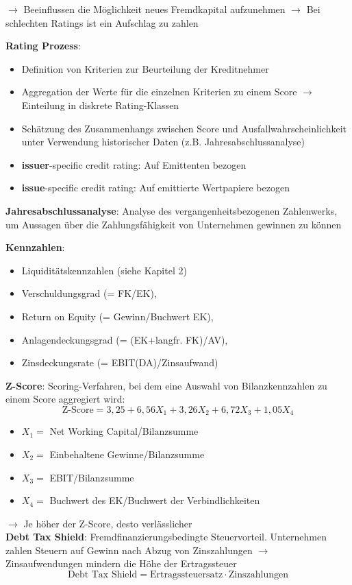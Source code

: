 $\rightarrow$ Beeinflussen die Möglichkeit neues Fremdkapital aufzunehmen
$\rightarrow$ Bei schlechten Ratings ist ein Aufschlag zu zahlen

\textbf{Rating Prozess}:
\begin{itemize}
	\item Definition von Kriterien zur Beurteilung der Kreditnehmer
	\item Aggregation der Werte für die einzelnen Kriterien zu einem Score $\rightarrow$ Einteilung in diskrete Rating-Klassen
	\item Schätzung des Zusammenhangs zwischen Score und Ausfallwahrscheinlichkeit unter Verwendung historischer Daten (z.B. Jahresabschlussanalyse)
	\item \textbf{issuer}-specific credit rating: Auf Emittenten bezogen
	\item \textbf{issue}-specific credit rating: Auf emittierte Wertpapiere bezogen
\end{itemize}
\bigskip
\textbf{Jahresabschlussanalyse}: Analyse des vergangenheitsbezogenen Zahlenwerks, um Aussagen über die Zahlungsfähigkeit von Unternehmen gewinnen zu können

\textbf{Kennzahlen}: 
\begin{itemize}
	\item Liquiditätskennzahlen (siehe Kapitel 2)
	\item Verschuldungsgrad (= FK/EK),
	\item Return on Equity (= Gewinn/Buchwert EK),
	\item Anlagendeckungsgrad (= (EK+langfr. FK)/AV),
	\item Zinsdeckungsrate (= EBIT(DA)/Zinsaufwand)
\end{itemize}

\textbf{Z-Score}: Scoring-Verfahren, bei dem eine Auswahl von Bilanzkennzahlen zu einem Score aggregiert wird:
$$\text{Z-Score}=3,25 + 6,56X_1 + 3,26X_2 + 6,72X_3 + 1,05X_4$$
\begin{itemize}
	\item $X_1=$ Net Working Capital/Bilanzsumme
	\item $X_2=$ Einbehaltene Gewinne/Bilanzsumme
	\item $X_3=$ EBIT/Bilanzsumme
	\item $X_4=$ Buchwert des EK/Buchwert der Verbindlichkeiten
\end{itemize}
$\rightarrow$ Je höher der Z-Score, desto verlässlicher\\

\textbf{Debt Tax Shield}: Fremdfinanzierungsbedingte Steuervorteil. Unternehmen zahlen Steuern auf Gewinn nach Abzug von Zinszahlungen $\rightarrow$ Zinsaufwendungen mindern die Höhe der Ertragssteuer
$$\text{Debt Tax Shield}=\text{Ertragssteuersatz}\cdot\text{Zinszahlungen}$$